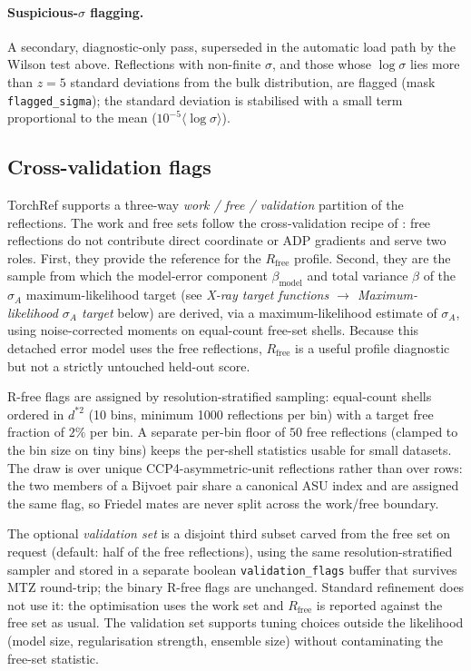 \documentclass{iucrjournals}
\begin{document}
\paragraph{Suspicious-$\sigma$ flagging.}
A secondary, diagnostic-only pass, superseded in the automatic load path by the
Wilson test above.  Reflections with non-finite $\sigma$, and those whose
$\log\sigma$ lies more than $z = 5$ standard deviations from the bulk
distribution, are flagged (mask \texttt{flagged\_sigma}); the standard deviation is
stabilised with a small term proportional to the mean
($10^{-5}\langle\log\sigma\rangle$).


\subsection{Cross-validation flags}

TorchRef supports a three-way \emph{work / free / validation} partition of
the reflections. The work and free sets follow the cross-validation recipe
of \cite{brunger_rfree_1992}: free reflections do not contribute direct
coordinate or ADP gradients and serve two roles. First, they provide the
reference for the $R_\mathrm{free}$ profile. Second, they are the sample from
which the model-error component $\beta_\mathrm{model}$ and total variance $\beta$ of the
$\sigma_{A}$ maximum-likelihood target (see \emph{X-ray target functions
$\to$ Maximum-likelihood $\sigma_{A}$ target} below) are
derived, via a maximum-likelihood estimate of $\sigma_A$, using noise-corrected
moments on equal-count free-set shells. Because this detached error model uses
the free reflections, $R_\mathrm{free}$ is a useful profile diagnostic but not
a strictly untouched held-out score.

R-free flags are assigned by resolution-stratified sampling: equal-count
shells ordered in $d^{\ast2}$ (10 bins, minimum 1000 reflections per bin) with a target
free fraction of $2\%$ per bin.  A separate per-bin floor of $50$
free reflections (clamped to the bin size on tiny bins) keeps the
per-shell statistics usable for small datasets.  The draw is over unique
CCP4-asymmetric-unit reflections rather than over rows: the two members of a
Bijvoet pair share a canonical ASU index and are assigned the same flag, so
Friedel mates are never split across the work/free boundary.  

The optional \emph{validation set} is a disjoint third subset carved from
the free set on request (default: half of the free reflections), using the
same resolution-stratified sampler and stored in a separate boolean
\texttt{validation\_flags} buffer that survives MTZ round-trip; the binary
R-free flags are unchanged.  Standard refinement does not use it: the
optimisation uses the work set and $R_\mathrm{free}$ is reported against the
free set as usual.  The validation set supports tuning choices outside the
likelihood (model size, regularisation strength, ensemble size) without
contaminating the free-set statistic.
\end{document}
